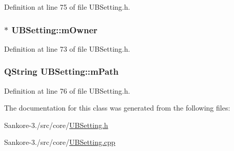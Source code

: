 Definition at line 75 of file U\-B\-Setting.\-h.

\hypertarget{class_u_b_setting_a2b0c7c506e9fb69725a68e54781eff08}{
\subsubsection[{m\-Owner}]{$\ast$ U\-B\-Setting\-::m\-Owner\hspace{0.3cm}{\ttfamily [protected]}}}\label{d7/d24/class_u_b_setting_a2b0c7c506e9fb69725a68e54781eff08}


Definition at line 73 of file U\-B\-Setting.\-h.

\hypertarget{class_u_b_setting_a0b6267dac1334d5478320fbff8eacd9f}{
\subsubsection[{m\-Path}]{\setlength{\rightskip}{0pt plus 5cm}Q\-String U\-B\-Setting\-::m\-Path\hspace{0.3cm}{\ttfamily [protected]}}}\label{d7/d24/class_u_b_setting_a0b6267dac1334d5478320fbff8eacd9f}


Definition at line 76 of file U\-B\-Setting.\-h.



The documentation for this class was generated from the following files\-:\begin{DoxyCompactItemize}
\item 
Sankore-\/3./src/core/\hyperlink{_u_b_setting_8h}{U\-B\-Setting.\-h}\item 
Sankore-\/3./src/core/\hyperlink{_u_b_setting_8cpp}{U\-B\-Setting.\-cpp}\end{DoxyCompactItemize}
